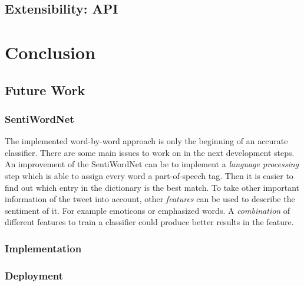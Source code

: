 \documentclass[a4paper]{article}
\begin{document}
\subsection{Extensibility: API}\label{section_api}

\section{Conclusion}
\subsection{Future Work}
\subsubsection{SentiWordNet}
The implemented word-by-word approach is only the beginning of an accurate classifier. There are some main issues to work on in the next development steps. An improvement of the SentiWordNet can be to implement a \textit{language processing} step which is able to assign every word a part-of-speech tag. Then it is easier to find out which entry in the dictionary is the best match. To take other important information of the tweet into account, other \textit{features} can be used to describe the sentiment of it. For example emoticons or emphasized words. A \textit{combination} of different features to train a classifier could produce better results in the feature.
\subsubsection{Implementation}
\subsubsection{Deployment}



\clearpage



\newpage
\end{document}
